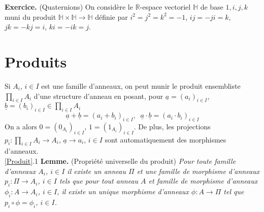 \documentclass[a4paper, oneside, 12pt]{book}
\theoremstyle{definition} %
\newcommand{\C}{\mathbb{C}}
\newcommand{\R}{\mathbb{R}}
\newcommand{\HH}{\mathbb{H}}
\begin{document}
 \textbf{Exercice.} (Quaternions) On considère le $\R$-espace vectoriel $\HH$ de base $1,i,j,k$ muni du produit $\HH\times \HH\rightarrow \HH$ définie par $i^2=j^2=k^2=-1$, $ij=-ji=k$, $jk=-kj=i$, $ki=-ik=j$. 
 
\section{Produits}\label{Produit (Anneaux)}\label{Produit} Si $A_i$, $i\in I$ est une famille d'anneaux, on peut munir le produit ensembliste $\prod_{i\in I}A_i$ d'une structure d'anneau en posant, pour $\underline{a}=(a_i)_{i\in I}$, $\underline{b}=(b_i)_{i\in I}\in \prod_{i\in I}A_i$
$$\underline{a}+\underline{b}=(a_i+b_i)_{i\in I},\;\; \underline{a}\cdot \underline{b}=(a_i\cdot b_i)_{i\in I}$$
On a alors $0 =(0_{A_i})_{i\in I}$, $1 =(1_{A_i})_{i\in I}$. De plus, les projections $p_i:\prod_{i\in I}A_i\rightarrow A_i$, $\underline{a}\rightarrow a_i$, $i\in I$ sont automatiquement des morphismes d'anneaux. \\

\ref{Produit}.1 \textbf{Lemme.} (Propriété universelle du produit) \textit{Pour toute famille d'anneaux $A_i$, $i\in I$ il existe un anneau $\Pi$ et une famille de morphisme d'anneaux $p_i:\Pi\rightarrow A_i$, $i\in I$ tels que pour tout anneau $A$ et famille de morphisme d'anneaux $\phi_i:A\rightarrow A_i$, $i\in I$, il existe un unique morphisme d'anneaux $\phi:A\rightarrow \Pi$ tel que $p_i\circ \phi=\phi_i$, $i\in I$. }
\end{document}
